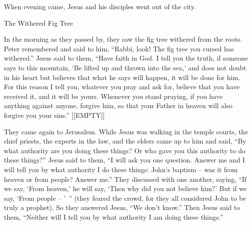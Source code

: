 {When
evening
came,
Jesus and his disciples went
out
of the city.
\par }{\SH The Withered Fig Tree
\par }{\PP {}In the morning
as
they passed by,
they saw
the fig tree
withered
from
the roots.
Peter
remembered
and
said
to him,
“Rabbi,
look! The fig tree
you cursed
has withered.”
Jesus
said
to them,
“Have
faith
in God.
I tell
you
the truth,
if someone
says
to this
mountain,
‘Be lifted up
and
thrown
into
the sea,’
and
does
not
doubt
in
his
heart
but
believes
that
what
he says
will happen,
it will be done
for him.
For this reason
I tell
you,
whatever
you pray
and
ask for,
believe
that
you have received
it, and
it will
be yours.
Whenever
you stand
praying,
if
you have
anything
against
anyone,
forgive
him, so that
your
Father
in
heaven
will
also forgive
you
your
sins.”
[[EMPTY]]
\par }{\SH \par }{\PP {}They came
again
to
Jerusalem.
While
Jesus was walking
in
the temple courts,
the chief priests,
the experts in the law,
and
the elders
came up
to
him
and
said,
“By
what
authority
are you doing
these things? Or
who
gave
you
this
authority
to
do
these things?”
Jesus
said
to them,
“I will ask
you
one
question.
Answer
me
and
I will tell
you
by
what
authority
I do
these things:
John’s
baptism
– was
it from
heaven
or
from
people? Answer
me.”
They discussed
with
one another,
saying,
“If
we say,
‘From
heaven,’
he will say,
‘Then
why
did you
not
believe
him?’
But
if we say,
‘From
people – ’ ” (they feared the crowd, for they all considered John to be truly a prophet).
So
they answered
Jesus, “We
don’t
know.”
Then
Jesus
said
to them,
“Neither
will
I
tell
you
by
what
authority
I am doing
these things.”

}
